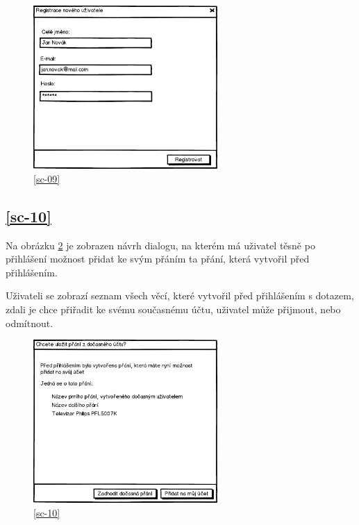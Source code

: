 \begin{figure}[htb]
\begin{center}
\includegraphics[width=70mm]{./pictures/mock/dialog-registrace.png}
\caption{\ref{sc-09}}
\label{fig:dialog-registrace}
\end{center}
\end{figure}

\subsection{\ref{sc-10}}
Na obrázku \ref{fig:dialog-pridani-docasnych-prani} je zobrazen návrh dialogu, na kterém má uživatel těsně po přihlášení možnost přidat ke svým přáním ta přání, která vytvořil před přihlášením.

Uživateli se zobrazí seznam všech věcí, které vytvořil před přihlášením s dotazem, zdali je chce přiřadit ke svému současnému účtu, uživatel může přijmout, nebo odmítnout.

\begin{figure}[htb]
\begin{center}
\includegraphics[width=70mm]{./pictures/mock/dialog-pridani-docasnych-prani.png}
\caption{\ref{sc-10}}
\label{fig:dialog-pridani-docasnych-prani}
\end{center}
\end{figure}
